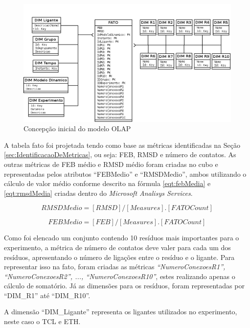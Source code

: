 \begin{figure}[h]
        \center
        \includegraphics[scale=0.45]{images/Modelo_OLAP.png}
        \caption{Concepção inicial do modelo OLAP}
        \label{fig:ConcepcaoModeloOLAP}
\end{figure}

A tabela fato foi projetada tendo como base as métricas identificadas na Seção \ref{sec:IdentificacaoDeMetricas}, ou seja: FEB, RMSD e número de contatos. As outras métricas de FEB médio e RMSD médio foram criadas no cubo e representadas pelos atributos ``FEBMedio'' e ``RMSDMedio'', ambos utilizando o cálculo de valor médio conforme descrito na fórmula \ref{eqt:febMedia} e \ref{eqt:rmsdMedia} criadas dentro do \emph{Microsoft Analisys Services}.

\begin{equation}
\label{eqt:febMedia}
        RMSDMedio = [RMSD]/[Measures].[FATO Count]
\end{equation}

\begin{equation}
\label{eqt:rmsdMedia}
        FEBMedio = [FEB]/[Measures].[FATO Count]
\end{equation}

Como foi elencado um conjunto contendo 10 resíduos mais importantes para o experimento, a métrica de número de contatos deve valer para cada um dos resíduos, apresentando o número de ligações entre o resíduo e o ligante. Para representar isso na fato, foram criadas as métricas \emph{``NumeroConexoesR1'', ``NumeroConexoesR2'', ..., ``NumeroConexoesR10''}, estes realizando apenas o cálculo de somatório. Já as dimensões para os resíduos, foram representadas por ``DIM\_R1'' até ``DIM\_R10''.

A dimensão ``DIM\_Ligante'' representa os ligantes utilizados no experimento, neste caso o TCL e ETH.

